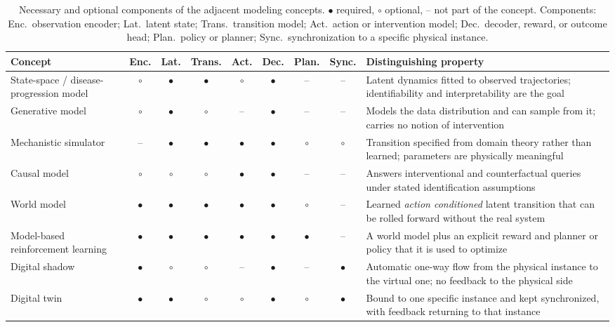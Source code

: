 \documentclass[journal]{IEEEtran}
\newif\ifsubmission
\begin{document}
\ifsubmission\else
\begin{table}[t]
\centering
\caption{Necessary and optional components of the adjacent modeling concepts. $\bullet$ required, $\circ$ optional, -- not part of the concept. Components: Enc.\ observation encoder; Lat.\ latent state; Trans.\ transition model; Act.\ action or intervention model; Dec.\ decoder, reward, or outcome head; Plan.\ policy or planner; Sync.\ synchronization to a specific physical instance.}
\label{tab:wm-taxonomy}
\footnotesize
\setlength{\tabcolsep}{4pt}
\renewcommand{\arraystretch}{1.15}
\begin{tabularx}{\textwidth}{>{\raggedright\arraybackslash}p{4.1cm} ccccccc >{\raggedright\arraybackslash}X}
\toprule
\textbf{Concept} & \textbf{Enc.} & \textbf{Lat.} & \textbf{Trans.} & \textbf{Act.} & \textbf{Dec.} & \textbf{Plan.} & \textbf{Sync.} & \textbf{Distinguishing property} \\
\midrule
State-space / disease-progression model & $\circ$ & $\bullet$ & $\bullet$ & $\circ$ & $\bullet$ & -- & -- & Latent dynamics fitted to observed trajectories; identifiability and interpretability are the goal \\
\addlinespace[2pt]
Generative model & $\circ$ & $\bullet$ & $\circ$ & -- & $\bullet$ & -- & -- & Models the data distribution and can sample from it; carries no notion of intervention \\
\addlinespace[2pt]
Mechanistic simulator & -- & $\bullet$ & $\bullet$ & $\bullet$ & $\bullet$ & $\circ$ & $\circ$ & Transition specified from domain theory rather than learned; parameters are physically meaningful \\
\addlinespace[2pt]
Causal model & $\circ$ & $\circ$ & $\circ$ & $\bullet$ & $\bullet$ & -- & -- & Answers interventional and counterfactual queries under stated identification assumptions \\
\addlinespace[2pt]
World model & $\bullet$ & $\bullet$ & $\bullet$ & $\bullet$ & $\bullet$ & $\circ$ & -- & Learned \emph{action conditioned} latent transition that can be rolled forward without the real system \\
\addlinespace[2pt]
Model-based reinforcement learning & $\bullet$ & $\bullet$ & $\bullet$ & $\bullet$ & $\bullet$ & $\bullet$ & -- & A world model plus an explicit reward and planner or policy that it is used to optimize \\
\addlinespace[2pt]
Digital shadow & $\bullet$ & $\circ$ & $\circ$ & -- & $\bullet$ & -- & $\bullet$ & Automatic one-way flow from the physical instance to the virtual one; no feedback to the physical side \\
\addlinespace[2pt]
Digital twin & $\bullet$ & $\bullet$ & $\circ$ & $\circ$ & $\bullet$ & $\circ$ & $\bullet$ & Bound to one specific instance and kept synchronized, with feedback returning to that instance \\
\bottomrule
\end{tabularx}
\end{table}
\fi
\end{document}
